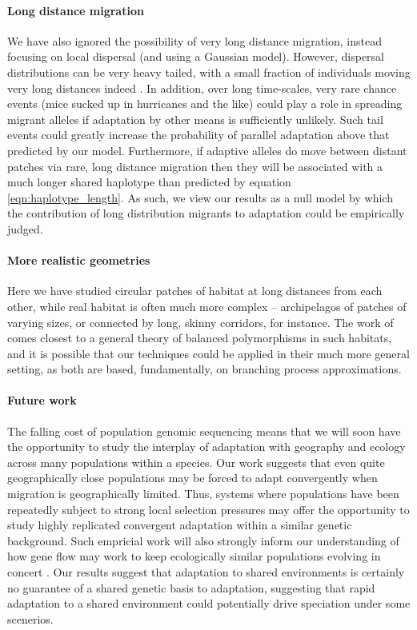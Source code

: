\documentclass{article}
\begin{document}
\paragraph{Long distance migration}
We have also ignored the possibility of very long distance migration,
instead focusing on local dispersal (and using a Gaussian model).
However, dispersal distributions can be very heavy tailed, 
with a small fraction of individuals moving very long distances indeed \citep{levin2003ecology,reynolds2009levy}.
In addition, over long time-scales, very rare chance events (mice sucked up in hurricanes and the like) 
could play a role in spreading migrant alleles if adaptation by other means is sufficiently unlikely.
Such tail events could greatly increase the probability of parallel adaptation above that predicted by our model. 
Furthermore, if adaptive alleles do move between distant patches via rare, long distance migration 
then they will be associated with a much longer shared haplotype than predicted by equation \eqref{eqn:haplotype_length}. 
As such, we view our results as a null model by which the contribution of long distribution migrants to adaptation could be empirically judged.   

\paragraph{More realistic geometries}
Here we have studied circular patches of habitat at long distances from each other,
while real habitat is often much more complex
-- archipelagos of patches of varying sizes, or connected by long, skinny corridors, for instance.
The work of \citet{cantrell1991diffusive} comes closest to a general theory of balanced polymorphisms in such habitats,
and it is possible that our techniques could be applied in their much more general setting,
as both are based, fundamentally, on branching process approximations.



\paragraph{Future work}
The falling cost of population genomic sequencing means that we will soon have the
opportunity to study the interplay of adaptation with geography and ecology 
across many populations within a species. 
Our work suggests that even quite geographically close populations 
may be forced to adapt convergently when migration is geographically limited. 
Thus, systems where populations have been repeatedly subject to 
strong local selection pressures may offer the opportunity 
to study highly replicated convergent adaptation within a similar genetic background.  
Such empricial work will also strongly inform our understanding of how gene flow 
may work to keep ecologically similar populations evolving in concert \citep{sexton2013genetic}.
Our results suggest that adaptation to shared environments is
certainly no guarantee of a shared genetic basis to adaptation, 
suggesting that rapid adaptation to a shared environment could potentially drive
speciation under some scenerios. 
\end{document}
